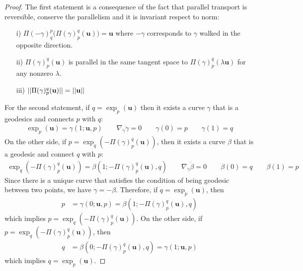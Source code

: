 \begin{proof}
	The first statement is a consequence of the fact that parallel transport is reversible, conserve the parallelism and it is invariant respect to norm: 
	\begin{enumerate}
		\item[i)] $\Pi(-\gamma)_{q}^{p}\Big(\Pi(\gamma)_{p}^{q}(\mathbf{u})\Big) = \mathbf{u}$ where $-\gamma$ corresponds to $\gamma$ walked in the opposite direction.
		\item[ii)] $\Pi(\gamma)_{p}^{q}(\mathbf{u})$ is parallel in the same tangent space to $\Pi(\gamma)_{p}^{q}(\lambda \mathbf{u})$ for any nonzero $\lambda$.
		\item[iii)] $\vert\lvert \Pi(\gamma)_{p}^{q}(\mathbf{u}) \rvert\vert = \vert\lvert \mathbf{u} \rvert\vert$ 
	\end{enumerate}
	For the second statement, if $q = \exp_{p}(\mathbf{u})$ then it exists a curve $\gamma$ that is a geodesics and connects $p$ with $q$:
	\begin{align*}
		\exp_{p}(\mathbf{u}) = \gamma(1;\mathbf{u}, p) 
		\qquad 
		\nabla_{\dot{\gamma}}\dot{\gamma}=0
		\qquad
		\gamma(0) = p
		\qquad
		\gamma(1) = q
	\end{align*}
	On the other side, if $p = \exp_{q}(-\Pi(\gamma)_{p}^{q}(\mathbf{u}))$, then it exists a curve $\beta$ that is a geodesic and connect $q$ with $p$: 
	\begin{align*}
		\exp_{q}(-\Pi(\gamma)_{p}^{q}(\mathbf{u}))= \beta(1;-\Pi(\gamma)_{p}^{q}(\mathbf{u}), q) 
		\qquad 
		\nabla_{\dot{\gamma}}\dot{\beta}=0
		\qquad
		\beta(0) = q
		\qquad
		\beta(1) = p
	\end{align*}
	Since there is a unique curve that satisfies the condition of being geodesic between two points, we have $\gamma = -\beta$. Therefore, if $q = \exp_{p}(\mathbf{u})$, then
	\begin{align*}
		p &=  \gamma(0;\mathbf{u}, p) = \beta( 1;-\Pi(\gamma)_{p}^{q}(\mathbf{u}), q) 
	\end{align*}
	 which implies $p = \exp_{q}(-\Pi(\gamma)_{p}^{q}(\mathbf{u}))$. On the other side, if $p = \exp_{q}(-\Pi(\gamma)_{p}^{q}(\mathbf{u}))$, then 
	\begin{align*}
	q &= \beta( 0;-\Pi(\gamma)_{p}^{q}(\mathbf{u}), q)  = \gamma(1;\mathbf{u}, p) 
	\end{align*}
	which implies $q = \exp_{p}(\mathbf{u})$.
\end{proof}


